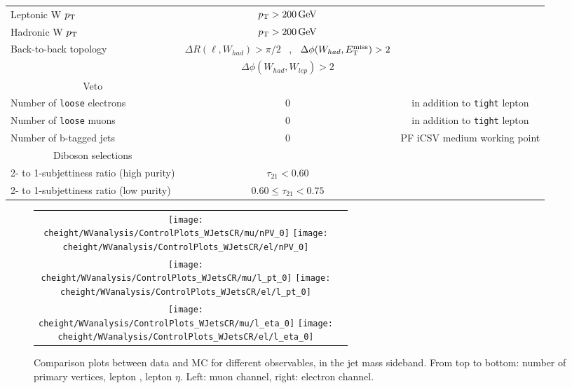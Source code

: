 \begin{table}[htb]
\begin{center}
\begin{tabular}{lcc}
Leptonic W $p_{\mathrm{T}}$      &  $p_{\mathrm{T}} > 200 \,\text{Ge\hspace{-.08em}V}$     & \\
Hadronic W $p_{\mathrm{T}}$      &  $p_{\mathrm{T}} > 200 \,\text{Ge\hspace{-.08em}V}$     & \\
Back-to-back topology & $\Delta R (\ell , W_{had}) > \pi/2$ $\,$ , $\,$  $\Delta \phi (W_{had} , \mbox{\ensuremath{E_{\mathrm{T}}^{\text{miss}}}})>2$ & \\ 
                      & $\Delta \phi (W_{had} , W_{lep})>2$ & \\
\hline
\multicolumn{1}{c}{Veto}\\
\cline{1-1}
Number of \texttt{loose} electrons & 0    & in addition to \texttt{tight} lepton \\
Number of \texttt{loose} muons & 0    & in addition to \texttt{tight} lepton \\
Number of b-tagged jets           & 0    & PF iCSV medium working point \\
\hline
\multicolumn{1}{c}{Diboson selections}\\
\cline{1-1}
2- to 1-subjettiness ratio (high purity) & $\tau_{21} < 0.60$                & \\
2- to 1-subjettiness ratio (low purity) & $0.60 \leq \tau_{21} < 0.75$ &\\
\hline						       
\end{tabular}
\end{center}
\end{table}

 \begin{figure}[htbp]
 \centering
 \begin{tabular}{cc}
 \texttt{[image: \\cheight/WVanalysis/ControlPlots\_WJetsCR/mu/nPV\_0]}
 \texttt{[image: \\cheight/WVanalysis/ControlPlots\_WJetsCR/el/nPV\_0]}\\
 \texttt{[image: \\cheight/WVanalysis/ControlPlots\_WJetsCR/mu/l\_pt\_0]}
 \texttt{[image: \\cheight/WVanalysis/ControlPlots\_WJetsCR/el/l\_pt\_0]}\\
 \texttt{[image: \\cheight/WVanalysis/ControlPlots\_WJetsCR/mu/l\_eta\_0]}
 \texttt{[image: \\cheight/WVanalysis/ControlPlots\_WJetsCR/el/l\_eta\_0]}\\
 \end{tabular}
 \caption{Comparison plots between data and MC for different observables, in the jet mass sideband.
 From top to bottom: number of primary vertices, lepton \PT{}, lepton $\eta$. 
 Left: muon channel, right: electron channel. }
 \label{fig:Wjets_controlPlots_1}
 \end{figure}

